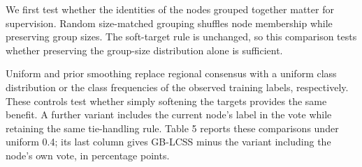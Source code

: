 We first test whether the identities of the nodes grouped together matter for supervision. Random size-matched grouping shuffles node membership while preserving group sizes. The soft-target rule is unchanged, so this comparison tests whether preserving the group-size distribution alone is sufficient.

Uniform and prior smoothing replace regional consensus with a uniform class distribution or the class frequencies of the observed training labels, respectively. These controls test whether simply softening the targets provides the same benefit. A further variant includes the current node's label in the vote while retaining the same tie-handling rule. Table 5 reports these comparisons under uniform 0.4; its last column gives GB-LCSS minus the variant including the node's own vote, in percentage points.

